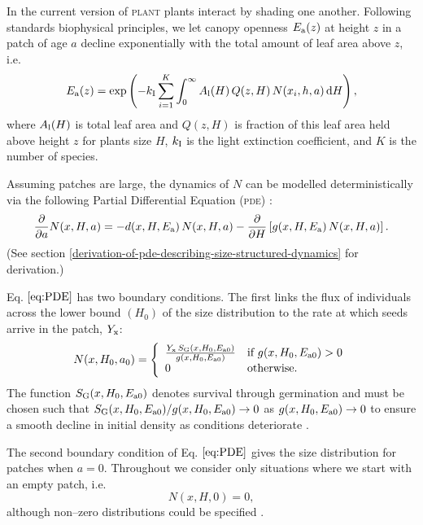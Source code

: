 \documentclass[10pt,twoside]{article}
\newcommand{\plant}{\textsc{plant}}
\begin{document}
In the current version of {\plant} plants interact by shading one another.
Following standards biophysical principles, we let canopy openness
\(E_{\rm a}(z)\) at height \(z\) in a patch of age \(a\) decline exponentially
with the total amount of leaf area above \(z\), i.e.
\begin{equation} \label{eq:light}
  E_{\rm a}(z) = \exp \left(-k_{\rm I}  \sum_{i = 1}^{K} \int_{0}^{\infty} A_{\rm l}(H) \, Q(z, H) \, N(x_i, h, a) \, {\rm d}H \right),
\end{equation}
where \(A_{\rm l}(H)\) is total leaf area and \(Q(z, H)\) is fraction of
this leaf area held above height \(z\) for plants size \(H\),
\(k_{\rm I}\) is the light extinction coefficient, and \(K\) is the number
of species.

Assuming patches are large, the dynamics of \(N\) can be modelled
deterministically via the following Partial Differential Equation (\textsc{pde})
\citep{Kohyama-1993, Deroos-1997, Moorcroft-2001}:
\begin{equation} \label{eq:PDE}
  \frac{\partial}{\partial a} N(x, H, a) = - d(x, H, E_{\rm a}) \, N(x, H, a) - \frac{\partial}{\partial H} \left[g(x, H, E_{\rm a}) \, N(x, H, a)\right].
\end{equation}
(See section \ref{derivation-of-pde-describing-size-structured-dynamics} for derivation.)

Eq. \(\ref{eq:PDE}\) has two boundary conditions. The first links the
flux of individuals across the lower bound \((H_0)\) of the size
distribution to the rate at which seeds arrive in the patch, \(Y_{\rm x}\):
\begin{equation} \label{eq:BC1}
  N(x, H_0, a_0) = \left\{
  \begin{array}{ll}   \frac{Y_{\rm x} \, S_{\rm G} (x, H_0, E_{{\rm a}0}) }{ g(x, H_0, E_{{\rm a}0}) }  & \textrm{if } g(x, H_0, E_{{\rm a}0}) > 0 \\
  0 & \textrm{otherwise.}
  \end{array} \right.
\end{equation}
The function \(S_{\rm G} (x, H_0, E_{{\rm a}0})\) denotes survival through
germination and must be chosen such that
\(S_{\rm G} (x, H_0, E_{{\rm a}0}) / g(x, H_0, E_{{\rm a}0}) \rightarrow 0\) as
\(g(x, H_0, E_{{\rm a}0}) \rightarrow 0\) to ensure a smooth decline in
initial density as conditions deteriorate \citep{Falster-2011}.

The second boundary condition of Eq. \(\ref{eq:PDE}\) gives the size
distribution for patches when \(a = 0\). Throughout we consider only
situations where we start with an empty patch, i.e.
\begin{equation} \label{eq:BC2} N\left(x, H,0\right) = 0,
\end{equation}
although non--zero distributions could be specified
\citep[e.g][]{Kohyama-1993, Moorcroft-2001}.
\end{document}
